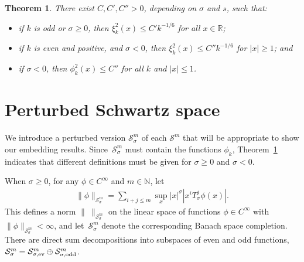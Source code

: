 \documentclass[pdftex]{sigma}
\newtheorem{Theorem}{Theorem}[section]
\newcommand{\R}{\mathbb{R}}
\newcommand{\N}{\mathbb{N}}
\renewcommand{\SS}{\mathcal{S}}
\newcommand{\Cinf}{C^\infty}
\begin{document}
  \begin{Theorem}\label{t:upper estimates of xi k}
  There exist $C,C',C''>0$, depending on $\sigma$ and $s$, such that:
    \begin{itemize}\itemsep=0pt

      \item[$(i)$] if $k$ is odd or $\sigma\ge0$, then $\xi_k^2(x)\le C'k^{-1/6}$ for all $x\in\R$;

      \item[$(ii)$] if $k$ is even and positive, and $\sigma<0$, then $\xi_k^2(x)\le C''k^{-1/6}$ for $|x|\ge 1$; and

      \item[$(iii)$] if $\sigma<0$, then $\phi_k^2(x)\le C''$ for all $k$ and $|x|\le1$.

    \end{itemize}
\end{Theorem}



\section{Perturbed Schwartz space}\label{s:SS sigma}

We introduce a perturbed version $\SS_\sigma^m$ of each $\SS^m$ that will be appropriate to show our embedding results. Since~$\SS_\sigma^m$ must contain the functions $\phi_k$, Theorem~\ref{t:upper estimates of xi k} indicates that dif\/ferent def\/initions must be given for $\sigma\ge0$ and $\sigma<0$.

When $\sigma\ge0$, for any $\phi\in\Cinf$ and $m\in\N$, let
  \begin{gather}\label{SS_sigma^m, sigma ge0}
    \|\phi\|_{\SS_\sigma^m}=\sum_{i+j\le m}\sup_x|x|^\sigma |x^iT_\sigma^j\phi(x)| .
  \end{gather}
This def\/ines a norm $\|\ \|_{\SS_\sigma^m}$ on the linear space of
functions $\phi\in\Cinf$ with $\|\phi\|_{\SS_\sigma^m}<\infty$,
and let~$\SS_\sigma^m$ denote the corresponding Banach space
completion. There are direct sum decompositions into
subspaces of even and odd functions, $\SS_\sigma^m=\SS_{\sigma,\text{\rm ev}}^m\oplus\SS_{\sigma,\text{\rm odd}}^m$.
\end{document}
